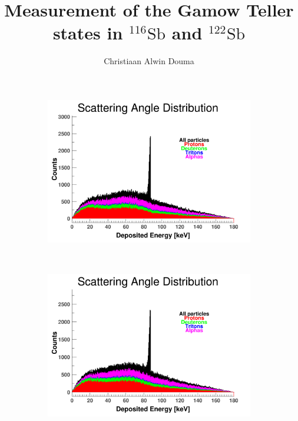 \documentclass[10pt,a4paper]{report}
\title{Measurement of the Gamow Teller states in ${^{116} \textrm{Sb}}$ and ${^{122} \textrm{Sb}}$}
\author{Christiaan Alwin Douma}
\begin{document}
 

\begin{figure}[htbp]
    \centering
    \begin{subfigure}[htbp]{0.42\textwidth}
        \label{fig:A1}
        \includegraphics[width=\textwidth]{./A1_FTFP_INCLXX_HP_Scat.png}
    \end{subfigure}
    ~ 
    \begin{subfigure}[htbp]{0.42\textwidth}
        \label{fig:A2}
        \includegraphics[width=\textwidth]{./A2_QGSP_INCLXX_Scat.png}
    \end{subfigure}
    
    \vspace{1mm}
    

\end{figure}
\end{document}
